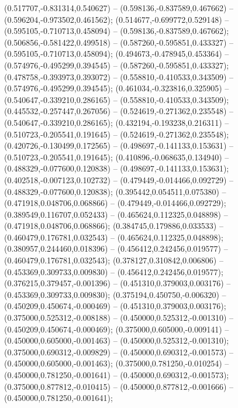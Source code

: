  (0.517707,-0.831314,0.540627) -- (0.598136,-0.837589,0.467662) -- (0.596204,-0.973502,0.461562);
 (0.514677,-0.699772,0.529148) -- (0.595105,-0.710713,0.458094) -- (0.598136,-0.837589,0.467662);
 (0.506856,-0.581422,0.499518) -- (0.587260,-0.595851,0.433327) -- (0.595105,-0.710713,0.458094);
 (0.494673,-0.478945,0.453364) -- (0.574976,-0.495299,0.394545) -- (0.587260,-0.595851,0.433327);
 (0.478758,-0.393973,0.393072) -- (0.558810,-0.410533,0.343509) -- (0.574976,-0.495299,0.394545);
 (0.461034,-0.323816,0.325905) -- (0.540647,-0.339210,0.286165) -- (0.558810,-0.410533,0.343509);
 (0.445532,-0.257447,0.267056) -- (0.524619,-0.271362,0.235548) -- (0.540647,-0.339210,0.286165);
 (0.432194,-0.193238,0.216311) -- (0.510723,-0.205541,0.191645) -- (0.524619,-0.271362,0.235548);
 (0.420726,-0.130499,0.172565) -- (0.498697,-0.141133,0.153631) -- (0.510723,-0.205541,0.191645);
 (0.410896,-0.068635,0.134940) -- (0.488329,-0.077600,0.120838) -- (0.498697,-0.141133,0.153631);
 (0.402518,-0.007123,0.102732) -- (0.479449,-0.014466,0.092729) -- (0.488329,-0.077600,0.120838);
 (0.395442,0.054511,0.075380) -- (0.471918,0.048706,0.068866) -- (0.479449,-0.014466,0.092729);
 (0.389549,0.116707,0.052433) -- (0.465624,0.112325,0.048898) -- (0.471918,0.048706,0.068866);
 (0.384745,0.179886,0.033533) -- (0.460479,0.176781,0.032543) -- (0.465624,0.112325,0.048898);
 (0.380957,0.244460,0.018396) -- (0.456412,0.242456,0.019577) -- (0.460479,0.176781,0.032543);
 (0.378127,0.310842,0.006806) -- (0.453369,0.309733,0.009830) -- (0.456412,0.242456,0.019577);
 (0.376215,0.379457,-0.001396) -- (0.451310,0.379003,0.003176) -- (0.453369,0.309733,0.009830);
 (0.375194,0.450750,-0.006320) -- (0.450209,0.450674,-0.000469) -- (0.451310,0.379003,0.003176);
 (0.375000,0.525312,-0.008188) -- (0.450000,0.525312,-0.001310) -- (0.450209,0.450674,-0.000469);
 (0.375000,0.605000,-0.009141) -- (0.450000,0.605000,-0.001463) -- (0.450000,0.525312,-0.001310);
 (0.375000,0.690312,-0.009829) -- (0.450000,0.690312,-0.001573) -- (0.450000,0.605000,-0.001463);
 (0.375000,0.781250,-0.010254) -- (0.450000,0.781250,-0.001641) -- (0.450000,0.690312,-0.001573);
 (0.375000,0.877812,-0.010415) -- (0.450000,0.877812,-0.001666) -- (0.450000,0.781250,-0.001641);
